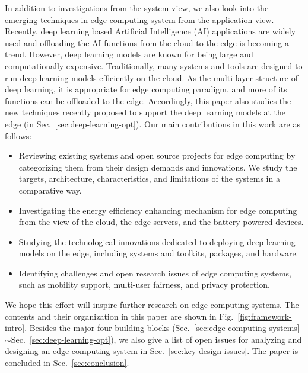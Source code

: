 In addition to investigations from the system view, we also look into the emerging techniques in edge computing system from the application view. Recently, deep learning based Artificial Intelligence (AI) applications are widely used and offloading the AI functions from the cloud to the edge is becoming a trend. However, deep learning models are known for being large and computationally expensive. Traditionally, many systems and tools are designed to run deep learning models efficiently on the cloud. As the multi-layer structure of deep learning, it is appropriate for edge computing paradigm, and more of its functions can be offloaded to the edge. Accordingly, this paper also studies the new techniques recently proposed to support the deep learning models at the edge (in Sec.~\ref{sec:deep-learning-opt}).
Our main contributions in this work are as follows:
\begin{itemize}
\item Reviewing existing systems and open source projects for edge computing by categorizing them from their design demands and innovations. We study the targets, architecture, characteristics, and limitations of the systems in a comparative way.
\item Investigating the energy efficiency enhancing mechanism for edge computing from the view of the cloud, the edge servers, and the battery-powered devices.
\item Studying the technological innovations dedicated to deploying deep learning models on the edge, including systems and toolkits, packages, and hardware.
\item Identifying challenges and open research issues of edge computing systems, such as mobility support, multi-user fairness, and privacy protection.
\end{itemize}
We hope this effort will inspire further research on edge computing systems. The contents and their organization in this paper are shown in Fig.~\ref{fig:framework-intro}. Besides the major four building blocks (Sec.~\ref{sec:edge-computing-systems}$\sim$Sec.~\ref{sec:deep-learning-opt}), we also give a list of open issues for analyzing and designing an edge computing system in Sec.~\ref{sec:key-design-issues}. The paper is concluded in Sec.~\ref{sec:conclusion}.

